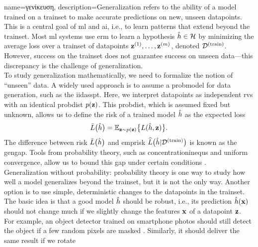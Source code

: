 {name={\foreignlanguage{greek}{γενίκευση}}, 
	description={Generalization 
		refers to the ability of a \gls{model} trained on a \gls{trainset} to make accurate 
		\gls{prediction}s on new, unseen \gls{datapoint}s. This is a central goal of \gls{ml} and \gls{ai}, i.e.,
		to learn patterns that extend beyond the \gls{trainset}. Most \gls{ml} systems 
		use \gls{erm} to learn a \gls{hypothesis} $\hat{h} \in \mathcal{H}$ by minimizing 
		the average \gls{loss} over a \gls{trainset} of \gls{datapoint}s ${\bf z}^{(1)}, \ldots, {\bf z}^{(m)}$, 
		denoted $\mathcal{D}^{(\rm train)}$. However, success on the \gls{trainset} does not guarantee success on 
		unseen \gls{data}—this discrepancy is the challenge of generalization. \\ To study generalization 
		mathematically, we need to formalize the notion of ``unseen'' \gls{data}. A widely used 
		approach is to assume a \gls{probmodel} for \gls{data} generation, such as the \gls{iidasspt}. 
		Here, we interpret \gls{datapoint}s as independent \gls{rv}s with an identical 
		\gls{probdist} $p({\bf z})$. This \gls{probdist}, which is assumed fixed but unknown, 
		allows us to define the \gls{risk} of a trained \gls{model} $\hat{h}$ as the expected \gls{loss}
		\[
		\bar{L} \big( \hat{h} \big)=\mathbb{E}_{{\bf z} \sim p({\bf z})} \big\{ L(\hat{h}, {\bf z}) \big\}.
		\]
		The difference between \gls{risk} $\bar{L} \big( \hat{h} \big)$ and \gls{emprisk} $\widehat{L}\big(\hat{h}|\mathcal{D}^{(\rm train)}\big)$ 
		is known as the \gls{gengap}. Tools from \gls{probability} theory, such as \gls{concentrationinequ}s 
		and uniform convergence, allow us to bound this gap under certain conditions \cite{ShalevMLBook}.\\
		Generalization without \gls{probability}: \Gls{probability} theory is one way to study how well a 
		\gls{model} generalizes beyond the \gls{trainset}, but it is not the only way. Another option is to use 
		simple, deterministic changes to the \gls{datapoint}s in the \gls{trainset}. The basic idea is that a 
		good \gls{model} $\hat{h}$ should be robust, i.e., its \gls{prediction} $\hat{h}({\bf x})$ 
		should not change much if we slightly change the \gls{feature}s ${\bf x}$ of a \gls{datapoint} ${\bf z}$. 
		\\[1mm] For example, an object detector trained on smartphone photos should still detect the object if a few 
		random pixels are masked \cite{OnePixelAttack}. Similarly, it should deliver the same result if we rotate 
}}
